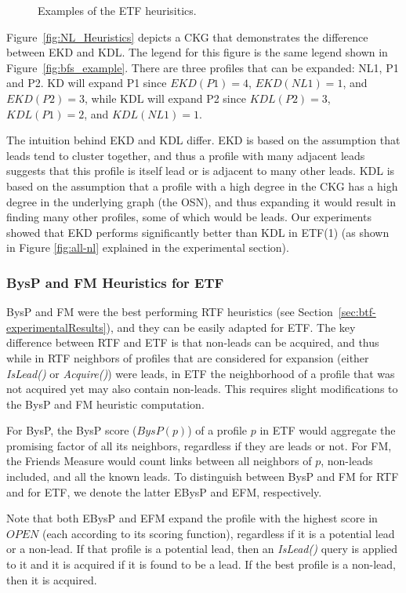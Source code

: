 \documentclass[journal]{IEEEtran}
\newcommand{\islead}[1]{{\em IsLead(#1)}}
\newcommand{\acquire}[1]{{\em Acquire(#1)}}
\begin{document}
\begin{figure}
\caption{Examples of the ETF heurisitics.}
\label{fig:efm-and-ebysp}

\end{figure}


Figure~\ref{fig:NL_Heuristics} depicts a CKG that demonstrates the difference between EKD and KDL. The legend for this figure is the same legend shown in Figure~\ref{fig:bfs_example}. There are three profiles that can be
expanded: NL1, P1 and P2. KD will expand P1 since $EKD(P1)=4$, $EKD(NL1)=1$, and
$EKD(P2)=3$, while KDL will expand P2 since $KDL(P2)=3$, $KDL(P1)=2$, and
$KDL(NL1)=1$.


The intuition behind EKD and KDL differ. EKD is based on the assumption that
leads tend to cluster together, and thus a profile with many adjacent leads
suggests that this profile is itself lead or is adjacent to many other leads.
KDL is based on the assumption that a profile with a high degree in the CKG has
a high degree in the underlying graph (the OSN), and thus expanding it would
result in finding many other profiles, some of which would be leads.
Our experiments showed that EKD performs significantly better than
KDL in ETF(1) (as shown in Figure \ref{fig:all-nl} explained in the
experimental section).

\subsubsection{BysP and FM Heuristics for ETF}



BysP and FM were the best performing RTF heuristics (see Section~\ref{sec:btf-experimentalResults}), and they can be easily adapted for ETF. The key difference between RTF and ETF is that non-leads can be acquired, and thus while in RTF neighbors of profiles that are considered for expansion (either \islead{} or \acquire{}) were leads, in ETF the neighborhood of a profile that was not acquired yet may also contain non-leads. This requires slight modifications to the BysP and FM heuristic computation. 

For BysP, the BysP score ($BysP(p)$) of a profile $p$ in ETF would aggregate the promising factor of all its neighbors, regardless if they are leads or not. For FM, the Friends Measure would count links between all neighbors of $p$, non-leads included, and all the known leads. To distinguish between BysP and FM for RTF and for ETF, we denote the latter EBysP and EFM, respectively.

Note that both EBysP and EFM expand the profile with the highest score in $OPEN$ (each according to its scoring function), regardless if it is a potential lead or a non-lead. If that profile is a potential lead, then an \islead{} query is applied to it and it is acquired if it is found to be a lead. If the best profile is a non-lead, then it is acquired. 
\end{document}
